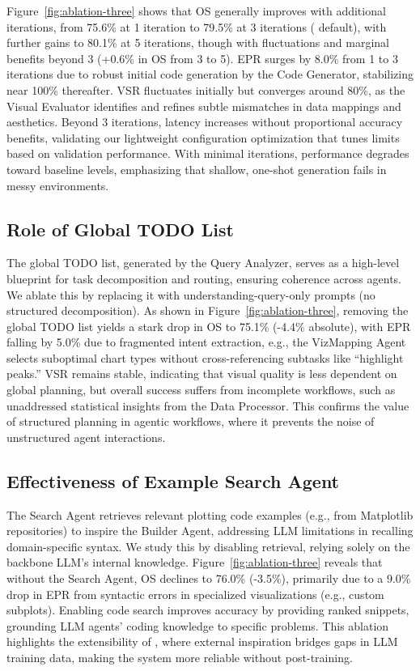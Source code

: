 Figure~\ref{fig:ablation-three} shows that OS generally improves with additional iterations, from 75.6\% at 1 iteration to 79.5\% at 3 iterations (\methodname{} default), with further gains to 80.1\% at 5 iterations, though with fluctuations and marginal benefits beyond 3 (+0.6\% in OS from 3 to 5).
EPR surges by 8.0\% from 1 to 3 iterations due to robust initial code generation by the Code Generator, stabilizing near 100\% thereafter. VSR fluctuates initially but converges around 80\%, as the Visual Evaluator identifies and refines subtle mismatches in data mappings and aesthetics. 
Beyond 3 iterations, latency increases without proportional accuracy benefits, validating our lightweight configuration optimization that tunes limits based on validation performance. 
With minimal iterations, performance degrades toward baseline levels, emphasizing that shallow, one-shot generation fails in messy environments.

\subsection{Role of Global TODO List}

The global TODO list, generated by the Query Analyzer, serves as a high-level blueprint for task decomposition and routing, ensuring coherence across agents.
We ablate this by replacing it with understanding-query-only prompts (no structured decomposition).
As shown in Figure~\ref{fig:ablation-three}, removing the global TODO list yields a stark drop in OS to 75.1\% (-4.4\% absolute), 
with EPR falling by 5.0\% due to fragmented intent extraction, e.g., the VizMapping Agent selects suboptimal chart types without cross-referencing subtasks like ``highlight peaks.''
VSR remains stable, indicating that visual quality is less dependent on global planning, but overall success suffers from incomplete workflows, such as unaddressed statistical insights from the Data Processor. 
This confirms the value of structured planning in agentic workflows, where it prevents the noise of unstructured agent interactions.

\subsection{Effectiveness of Example Search Agent}
The Search Agent retrieves relevant plotting code examples (e.g., from Matplotlib repositories) to inspire the Builder Agent, addressing LLM limitations in recalling domain-specific syntax. We study this by disabling retrieval, relying solely on the backbone LLM's internal knowledge.
Figure~\ref{fig:ablation-three} reveals that without the Search Agent, OS declines to 76.0\% (-3.5\%), 
primarily due to a 9.0\% drop in EPR from syntactic errors in specialized visualizations (e.g., custom subplots). 
Enabling code search improves accuracy by providing ranked snippets, grounding LLM agents' coding knowledge to specific problems. This ablation highlights the extensibility of \methodname{}, where external inspiration bridges gaps in LLM training data, making the system more reliable without post-training.



